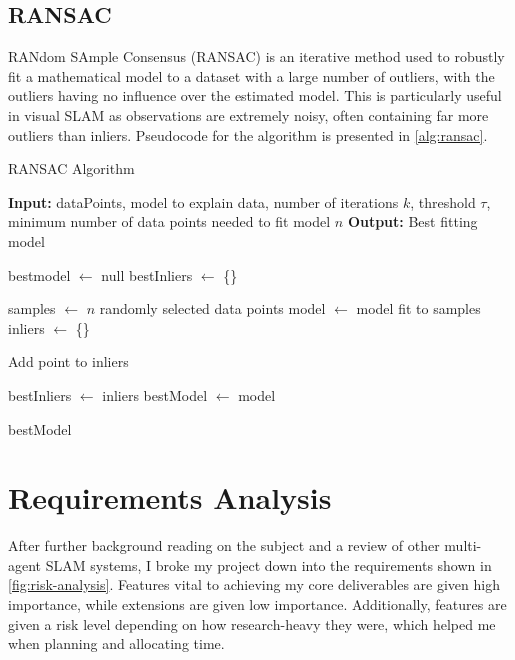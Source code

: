 \subsection{RANSAC}
\label{sec:ransac}

RANdom SAmple Consensus (RANSAC) is an iterative method used to robustly fit a mathematical model to a dataset with a large number of outliers, with the outliers having no influence over the estimated model. This is particularly useful in visual SLAM as observations are extremely noisy, often containing far more outliers than inliers. Pseudocode for the algorithm is presented in \autoref{alg:ransac}.

\begin{algorithm}[h]
    \caption{RANSAC Algorithm}
    \label{alg:ransac}
    \begin{algorithmic}[1]
        \State \textbf{Input:} dataPoints, model to explain data, number of iterations $k$, threshold $\tau$, minimum number of data points needed to fit model $n$
        \State \textbf{Output:} Best fitting model

        \State bestmodel $\leftarrow$ null
        \State bestInliers $\leftarrow$ \{\}

        \State samples $\leftarrow$ $n$ randomly selected data points
        \State model $\leftarrow$ model fit to samples
        \State inliers $\leftarrow$ \{\}

        \State Add point to inliers
        \EndIf
        \EndFor

        \State bestInliers $\leftarrow$ inliers
        \State bestModel $\leftarrow$ model
        \EndIf
        \EndFor

        \State \Return bestModel
    \end{algorithmic}
\end{algorithm}

\section{Requirements Analysis}
\label{sec:requirements-analysis}
After further background reading on the subject and a review of other multi-agent SLAM systems, I broke my project down into the requirements shown in \autoref{fig:risk-analysis}. Features vital to achieving my core deliverables are given high importance, while extensions are given low importance. Additionally, features are given a risk level depending on how research-heavy they were, which helped me when planning and allocating time.



